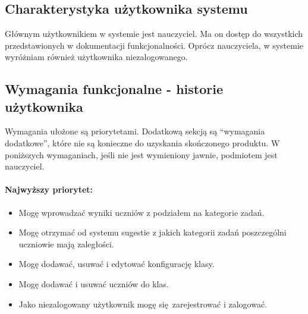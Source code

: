 \documentclass[polish,12pt]{aghthesis}
\author{Andrzej Sołtysik}
\date{\the\year}
\begin{document}
\maketitle

\section{\SectionTitleProjectVision}
\label{sec:cel-wizja}

\section{\SectionTitleScope}
\label{sec:zakres-funkcjonalnosci}

\subsection{Charakterystyka użytkownika systemu}

Głównym użytkownikiem w systemie jest nauczyciel. Ma on dostęp do wszystkich przedstawionych w dokumentacji funkcjonalności. Oprócz nauczyciela, w systemie wyróżniam również użytkownika niezalogowanego. 

\subsection{Wymagania funkcjonalne - historie użytkownika}

Wymagania ułożone są priorytetami. Dodatkową sekcją są ``wymagania dodatkowe'', które nie są konieczne do uzyskania skończonego produktu. W poniższych wymaganiach, jeśli nie jest wymieniony jawnie, podmiotem jest nauczyciel.

\paragraph{Najwyższy priorytet:}
\begin{itemize}
	\item{Mogę wprowadzać wyniki uczniów z podziałem na kategorie zadań.}
	\item{Mogę otrzymać od systemu sugestie z jakich kategorii zadań poszczególni uczniowie mają zaległości.}
	\item{Mogę dodawać, usuwać i edytować konfigurację klasy.}
	\item{Mogę dodawać i usuwać uczniów do klas.}
	\item{Jako niezalogowany użytkownik mogę się zarejestrować i zalogować.}
\end{itemize}
\end{document}
